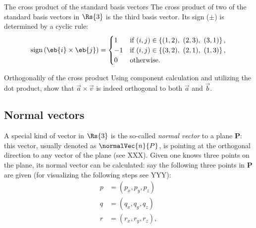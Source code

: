 \begin{note}{The cross product of the standard basis vectors}{}
	The cross product of two of the standard basis vectors in $\Rs{3}$ is the third basis vector. Its sign ($\pm$) is determined by a cyclic rule:
	\begin{equation*}
		\text{sign}\left( \eb{i}\times\eb{j} \right) =
		\begin{cases}
			1 & \text{if } (i,j)\in \left\{(1,2),\ (2,3),\ (3,1)\right\},\\
			-1 & \text{if } (i,j)\in \left\{(3,2),\ (2,1),\ (1,3)\right\},\\
			0 & \text{otherwise}.
		\end{cases}
	\end{equation*}
\end{note}
\begin{challange}{Orthogonalily of the cross product}{}
	Using component calculation and utilizing the dot product, show that $\vec{a}\times\vec{v}$ is indeed orthogonal to both $\vec{a}$ and $\vec{b}$.
\end{challange}

\subsection{Normal vectors}

A special kind of vector in $\Rs{3}$ is the so-called \emph{normal vector} to a plane $\mathbf{P}$: this vector, usually denoted as $\normalVec{n}{P}$, is pointing at the orthogonal direction to any vector of the plane (see XXX). Given one knows three points on the plane, its normal vector can be calculated: say the following three points in $\mathbf{P}$ are given (for visualizing the following steps see YYY):
\begin{align}
	p &= (p_{x}, p_{y}, p_{z})\nonumber\\
	q &= (q_{x}, q_{y}, q_{z})\nonumber\\
	r &= (r_{x}, r_{y}, r_{z}),
	\label{eq:three points in a plane}
\end{align}

